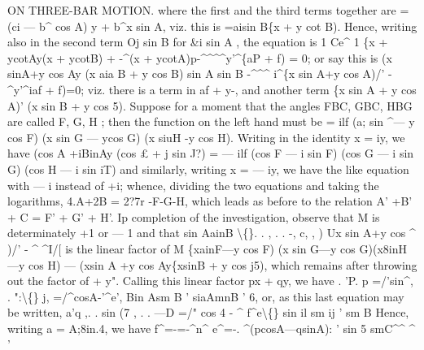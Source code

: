 \documentclass[12pt,a4paper]{article}
\begin{document}
ON THREE-BAR MOTION.
where
the
first
and
the
third
terms
together
are = (ci --- b\textasciicircum{} cos A) y + b\textasciicircum{}x sin A,
viz.
this
is
=aisin B\{x + y cot B).
Hence,
writing
also
in
the
second
term
Oj sin B
for
\&i sin A
,
the equation
is
1
Ce\textasciicircum{}
1
\{x + ycotAy(x + ycotB) + -\textasciicircum{}(x + ycotA)p-\textasciicircum{}\textasciicircum{}\textasciicircum{}\textasciicircum{}y'\textasciicircum{}\{aP + f) = 0;
or say this
is
(x sinA+y cos Ay (x aia B + y cos B)
sin A sin B
-\textasciicircum{}\textasciicircum{}\textasciicircum{}
i\textasciicircum{}\{x sin A+y cos A)/' -\textasciicircum{}y'\textasciicircum{}iaf + f)=0;
viz. there
is a term
in
af + y-, and another term
\{x sin A + y cos A)' (x sin B + y cos 5).
Suppose
for
a moment
that
the angles FBC, GBC, HBG are
called
F,
G, H
;
then
the function on
the
left hand must be
= ilf (a; sin \textasciicircum{}--- y cos F) (x sin G --- ycos G) (x siuH -y cos H).
Writing
in
the identity x = iy, we have
(cos A +iBinAy (cos \pounds{} + j sin J?) = --- ilf (cos F --- i sin F) (cos G --- i sin G) (cos H --- i sin iT)
and
similarly,
writing
x = --- iy,
we
have
the
like
equation
with --- i
instead
of +i;
whence, dividing the two equations and taking the
logarithms,
4.A+2B = 2?\guillemotleft{}7r -F-G-H,
which
leads as before
to the
relation A' +B' + C = F' + G' + H'.
Ip
completion
of
the
investigation,
observe
that M
is
determinately +1
or --- 1
and that
sin AainB \textbackslash\{\}.
.
,
.
.
-,
c,
,
)
Ux sin A+y cos \textasciicircum{} )/' - \textasciicircum{} \textasciicircum{}I/[
is the
linear factor of
M \{xainF---y cos F) (x sin G---y cos G)(x8inH---y cos H)
--- (xsin A +y cos Ay\{xsinB + y cos j5),
which
remains after throwing
out
the
factor
of + y".
Calling
this
linear
factor px + qy,
we have
.
\textdegree{}'P.
p =/'sin\textasciicircum{},
.
":\textbackslash\{\}
j, =/\textasciicircum{}cosA-'\textasciicircum{}e',
Bin Asm B
\textbullet{}'
siaAmnB
\textbullet{}'
6,
or, as
this
last equation may be
written,
a'q
,.
.
sin (7
,
.
. ---D =/" cos 4 - \textasciicircum{} f\textasciicircum{}e\textbackslash\{\}
sin il sm ij
\textbullet{}'
sm B
Hence, writing a = A;8in.4, we have
f\textasciicircum{}=-=-\textasciicircum{}n\textasciicircum{}
e\textasciicircum{}=-.
\textasciicircum{}(pcosA---qsinA):
\textbullet{}'
sin 5
smC\textasciicircum{}\textasciicircum{}
\textasciicircum{}
'
\end{document}
